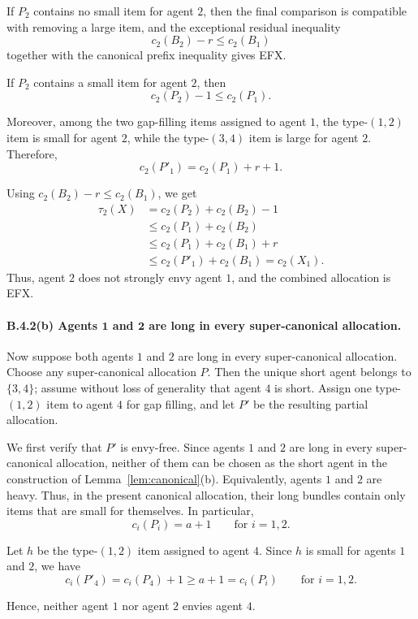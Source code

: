 \documentclass{article}
\theoremstyle{definition}
\begin{document}
If $P_2$ contains no small item for agent $2$, then the final comparison is
compatible with removing a large item, and the exceptional residual inequality
\[
    c_2(B_2)-r\le c_2(B_1)
\]
together with the canonical prefix inequality gives EFX.

If $P_2$ contains a small item for agent $2$, then
\[
    c_2(P_2)-1\le c_2(P_1).
\]

Moreover, among the two gap-filling items assigned to agent $1$, the
type-$(1,2)$ item is small for agent $2$, while the type-$(3,4)$ item is large
for agent $2$.  Therefore,
\[
    c_2(P'_1)=c_2(P_1)+r+1.
\]

Using $c_2(B_2)-r\le c_2(B_1)$, we get
\[
\begin{aligned}
    \tau_2(X)
    &=c_2(P_2)+c_2(B_2)-1 \\
    &\le c_2(P_1)+c_2(B_2) \\
    &\le c_2(P_1)+c_2(B_1)+r \\
    &\le c_2(P'_1)+c_2(B_1)
    =c_2(X_1).
\end{aligned}
\]
Thus, agent $2$ does not strongly envy agent $1$, and the combined allocation
is EFX.


\paragraph{B.4.2(b) Agents $\boldsymbol{1}$ and $\boldsymbol{2}$ are long in every super-canonical allocation.}
Now suppose both agents $1$ and $2$ are long in every super-canonical
allocation.  Choose any super-canonical allocation $P$.  Then the unique short
agent belongs to $\{3,4\}$; assume without loss of generality that agent $4$
is short.  Assign one type-$(1,2)$ item to agent $4$ for gap filling, and let
$P'$ be the resulting partial allocation.

We first verify that $P'$ is envy-free.  Since agents $1$ and $2$ are long in
every super-canonical allocation, neither of them can be chosen as the short
agent in the construction of Lemma~\ref{lem:canonical}(b).  Equivalently,
agents $1$ and $2$ are heavy.  Thus, in the present canonical allocation,
their long bundles contain only items that are small for themselves.  In
particular,
\[
    c_i(P_i)=a+1
    \qquad\text{for } i=1,2.
\]

Let $h$ be the type-$(1,2)$ item assigned to agent $4$.  Since $h$ is small
for agents $1$ and $2$, we have
\[
    c_i(P'_4)=c_i(P_4)+1\ge a+1=c_i(P_i)
    \qquad\text{for } i=1,2.
\]

Hence, neither agent $1$ nor agent $2$ envies agent $4$.
\end{document}

